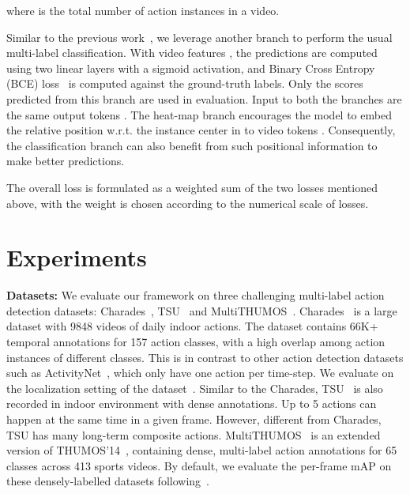 \documentclass[10pt,twocolumn,letterpaper]{article}
\begin{document}
where  is the total number of action instances in a video. 

Similar to the previous work~\cite{Dai_2021_WACV,MLAD}, we leverage another branch to perform the usual multi-label classification. With video features , the predictions are computed using two linear layers with a sigmoid activation, and Binary Cross Entropy (BCE) loss~\cite{nam2014large} is computed against the ground-truth labels. Only the scores predicted from this branch are used in evaluation. 
Input to both the branches are the same output tokens . 
The heat-map branch encourages the model to embed the relative position w.r.t. the instance center in to video tokens .  
Consequently, the classification branch can also benefit from such positional information to make better predictions. 


The overall loss is formulated as a weighted sum of the two losses mentioned above, with the weight  is chosen according to the numerical scale of losses.

\section{Experiments}
\label{sec:experiment}
\noindent\textbf{Datasets:} We evaluate our framework on three challenging multi-label action detection datasets: Charades~\cite{charades}, TSU~\cite{dai2020toyota} and MultiTHUMOS~\cite{multi-thumos}. 
Charades~\cite{charades} is a large dataset with 9848 videos of daily indoor actions. The dataset contains 66K+ temporal annotations for 157 action classes, with a high overlap among action instances of different classes.  This is in contrast to other action detection datasets such as ActivityNet~\cite{caba2015activitynet}, which only have one action per time-step. We evaluate on the localization setting of the dataset~\cite{sigurdsson2017asynchronous}. 
Similar to the Charades, TSU~\cite{dai2020toyota} is also recorded in indoor environment with dense annotations. Up to 5 actions can happen at the same time in a given frame. However, different from Charades, TSU has many long-term composite actions. 
MultiTHUMOS~\cite{multi-thumos} is an extended version of THUMOS’14~\cite{THUMOS14}, containing dense, multi-label action annotations for 65 classes across 413 sports videos. 
By default, we evaluate the per-frame mAP on these densely-labelled datasets following~\cite{sigurdsson2017asynchronous,multi-thumos}.
\end{document}
